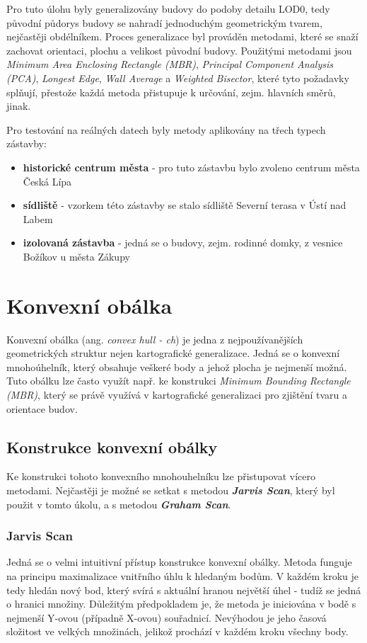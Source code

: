 \documentclass[12pt, a4paper]{article}
\begin{document}
Pro tuto úlohu byly generalizovány budovy do podoby detailu LOD0, tedy původní půdorys budovy se nahradí jednoduchým geometrickým tvarem, nejčastěji obdélníkem. Proces generalizace byl prováděn metodami, které se snaží zachovat orientaci, plochu a velikost původní budovy. Použitými metodami jsou \textit{Minimum Area Enclosing Rectangle (MBR)}, \textit{Principal Component Analysis (PCA)}, \textit{Longest Edge}, \textit{Wall Average} a \textit{Weighted Bisector}, které tyto požadavky splňují, přestože každá metoda přistupuje k určování, zejm. hlavních směrů, jinak.

Pro testování na reálných datech byly metody aplikovány na třech typech zástavby:
\begin{itemize}
    \item \textbf{historické centrum města} - pro tuto zástavbu bylo zvoleno centrum města Česká Lípa
    \item \textbf{sídliště} - vzorkem této zástavby se stalo sídliště Severní terasa v Ústí nad Labem
    \item \textbf{izolovaná zástavba} - jedná se o budovy, zejm. rodinné domky, z vesnice Božíkov u města Zákupy
\end{itemize}

\section{Konvexní obálka}
Konvexní obálka (ang. \textit{convex hull - ch}) je jedna z nejpoužívanějších geometrických struktur nejen kartografické generalizace. Jedná se o konvexní mnohoúhelník, který obsahuje veškeré body a jehož plocha je nejmenší možná. Tuto obálku lze často využít např. ke konstrukci \textit{Minimum Bounding Rectangle (MBR)}, který se právě využívá v kartografické generalizaci pro zjištění tvaru a orientace budov.


\subsection{Konstrukce konvexní obálky}
Ke konstrukci tohoto konvexního mnohouhelníku lze přistupovat vícero metodami. Nejčastěji je možné se setkat s metodou \textbf{\textit{Jarvis Scan}}, který byl použit v tomto úkolu, a s metodou \textbf{\textit{Graham Scan}}.

\subsubsection{Jarvis Scan}
Jedná se o velmi intuitivní přístup konstrukce konvexní obálky. Metoda funguje na principu maximalizace vnitřního úhlu k hledaným bodům. V každém kroku je tedy hledán nový bod, který svírá s aktuální hranou největší úhel - tudíž se jedná o hranici množiny. Důležitým předpokladem je, že metoda je iniciována v bodě s nejmenší Y-ovou (případně X-ovou) souřadnicí. Nevýhodou je jeho časová složitost ve velkých množinách, jelikož prochází v každém kroku všechny body.
\end{document}
